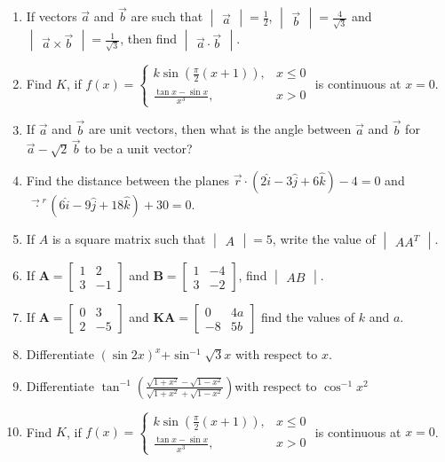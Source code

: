 \documentclass[12pt,-letter paper]{article}
\let\vec\mathbf{}
\let\vec\mathbf{}
\let\vec\mathbf{}
\providecommand{\mydet}[1]{\ensuremath{\begin{vmatrix}#1\end{vmatrix}}}
\providecommand{\myvec}[1]{\ensuremath{\begin{bmatrix}#1\end{bmatrix}}}
\providecommand{\brak}[1]{\ensuremath{\left(#1\right)}}
\begin{document}
\begin{enumerate}
\item If vectors $\overset{\rightarrow}{a}$ and $\overset{\rightarrow}{b}$ are such that $\mydet{\overset{\rightarrow}{a}}= \frac{1}{2}$, $\mydet{\overset{\rightarrow}{b}} = \frac{4}{\sqrt{3}}$ and $\mydet{\overset{\rightarrow}{a} \times \overset{\rightarrow}{b}} = \frac{1}{\sqrt{3}}$, then find $\mydet{\overset{\rightarrow}{a} \cdot \overset{\rightarrow}{b}}$.

\item Find $K$, if $f(x) = \begin{cases}
 k \sin\left(\frac{\pi}{2}(x+1)\right), & x \leq 0 \\
\frac{\tan{x} - \sin{x}}{x^3}, & x > 0          \end{cases}$ is continuous at $x = 0$.
\item If $\overset{\rightarrow}{a}$ and $\overset{\rightarrow}{b}$ are unit vectors, then what is the angle between $\overset{\rightarrow}{a}$ and $\overset{\rightarrow}{b}$ for $\overset{\rightarrow}{a} - \sqrt{2} \, \overset{\rightarrow}{b}$ to be a unit vector? 
\item Find the distance between the planes $ \overset{\rightarrow}{r} \cdot (2\hat{i} - 3\hat{j} + 6\hat{k}) - 4 = 0$ and $ \overset{\rightarrow{r}} \cdot (6\hat{i} - 9\hat{j} + 18\hat{k}) + 30 = 0.$
\item If $ A $ is a square matrix such that $\mydet{A} = 5 $, write the value of $\mydet{AA^T} $.
\item If $\vec{A}=\myvec{1 & 2 \\ 3 & -1}$ and  $\vec{B} = \myvec {1 & -4 \\ 3 & -2 }$, find $\mydet{AB}$.	
\item If $\vec{A}=\myvec{0 & 3 \\ 2 & -5}$ and $\vec{KA}=\myvec{0 & 4a \\ -8 & 5b }$ find the values of $k$ and $a$.	
\item Differentiate $(\sin{2x})^x$+$\sin^{-1}\sqrt3x$ with respect to $x$. 
\item Differentiate $\tan^{-1}{\brak{\frac{\sqrt{1+x^2}-\sqrt{1-x^2}}{\sqrt{1+x^2}+\sqrt{1-x^2}}} }$with respect to $\cos^{-1}{x^2}$
\item Find $K$, if $f(x) = \begin{cases} 
k \sin\left(\frac{\pi}{2}(x+1)\right), & x \leq 0 \\
	\frac{\tan{x} - \sin{x}}{x^3}, & x > 0 
\end{cases}$ is continuous at $x = 0$.

\end{enumerate}
\end{document}

